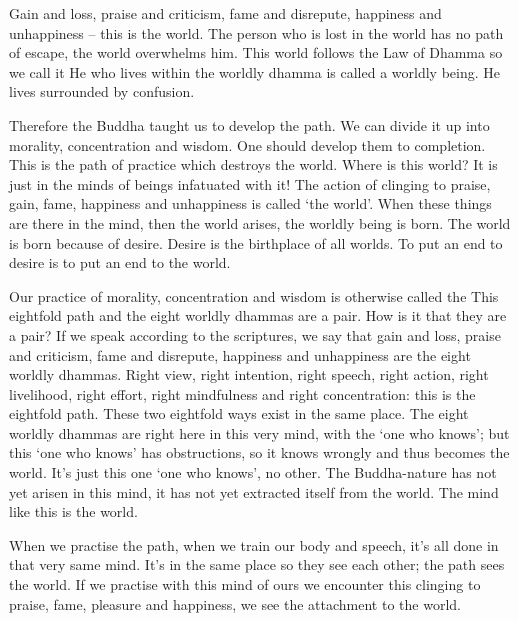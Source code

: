 Gain and loss, praise and criticism, fame and disrepute, happiness and unhappiness -- this is the world. The person who is lost in the world has no path of escape, the world overwhelms him. This world follows the Law of Dhamma so we call it  He who lives within the worldly dhamma is called a worldly being. He lives surrounded by confusion.

Therefore the Buddha taught us to develop the path. We can divide it up into morality, concentration and wisdom. One should develop them to completion. This is the path of practice which destroys the world. Where is this world? It is just in the minds of beings infatuated with it! The action of clinging to praise, gain, fame, happiness and unhappiness is called `the world'. When these things are there in the mind, then the world arises, the worldly being is born. The world is born because of desire. Desire is the birthplace of all worlds. To put an end to desire is to put an end to the world.

Our practice of morality, concentration and wisdom is otherwise called the  This eightfold path and the eight worldly dhammas are a pair. How is it that they are a pair? If we speak according to the scriptures, we say that gain and loss, praise and criticism, fame and disrepute, happiness and unhappiness are the eight worldly dhammas. Right view, right intention, right speech, right action, right livelihood, right effort, right mindfulness and right concentration: this is the eightfold path. These two eightfold ways exist in the same place. The eight worldly dhammas are right here in this very mind, with the `one who knows'; but this `one who knows' has obstructions, so it knows wrongly and thus becomes the world. It's just this one `one who knows', no other. The Buddha-nature has not yet arisen in this mind, it has not yet extracted itself from the world. The mind like this is the world.

When we practise the path, when we train our body and speech, it's all done in that very same mind. It's in the same place so they see each other; the path sees the world. If we practise with this mind of ours we encounter this clinging to praise, fame, pleasure and happiness, we see the attachment to the world.

